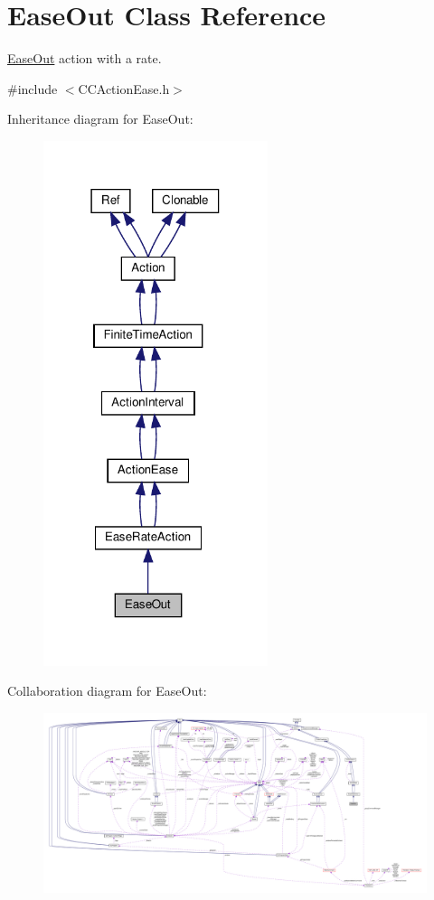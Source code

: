 \hypertarget{classEaseOut}{}\section{Ease\+Out Class Reference}
\label{classEaseOut}


\hyperlink{classEaseOut}{Ease\+Out} action with a rate.  




{\ttfamily \#include $<$C\+C\+Action\+Ease.\+h$>$}



Inheritance diagram for Ease\+Out\+:
\nopagebreak
\begin{figure}[H]
\begin{center}
\leavevmode
\includegraphics[width=186pt]{classEaseOut__inherit__graph}
\end{center}
\end{figure}


Collaboration diagram for Ease\+Out\+:
\nopagebreak
\begin{figure}[H]
\begin{center}
\leavevmode
\includegraphics[width=350pt]{classEaseOut__coll__graph}
\end{center}
\end{figure}
